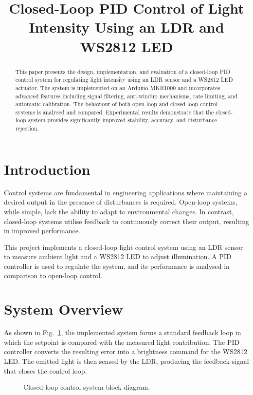 \documentclass[conference]{IEEEtran}
\title{Closed-Loop PID Control of Light Intensity Using an LDR and WS2812 LED}
\author{
\IEEEauthorblockN{Henry Johnson}
\IEEEauthorblockA{
MEng Electrical and Electronic Engineering\\
University of Lincoln\\
25590191@students.lincoln.ac.uk}
}
\begin{document}
\maketitle

\begin{abstract}
This paper presents the design, implementation, and evaluation of a closed-loop PID control system for regulating light intensity using an LDR sensor and a WS2812 LED actuator. The system is implemented on an Arduino MKR1000 and incorporates advanced features including signal filtering, anti-windup mechanisms, rate limiting, and automatic calibration. The behaviour of both open-loop and closed-loop control systems is analysed and compared. Experimental results demonstrate that the closed-loop system provides significantly improved stability, accuracy, and disturbance rejection.
\end{abstract}

\section{Introduction}

Control systems are fundamental in engineering applications where maintaining a desired output in the presence of disturbances is required. Open-loop systems, while simple, lack the ability to adapt to environmental changes. In contrast, closed-loop systems utilise feedback to continuously correct their output, resulting in improved performance.

This project implements a closed-loop light control system using an LDR sensor to measure ambient light and a WS2812 LED to adjust illumination. A PID controller is used to regulate the system, and its performance is analysed in comparison to open-loop control.

\section{System Overview}

As shown in Fig.~\ref{fig:block_diagram}, the implemented system forms a standard feedback loop in which the setpoint is compared with the measured light contribution. The PID controller converts the resulting error into a brightness command for the WS2812 LED. The emitted light is then sensed by the LDR, producing the feedback signal that closes the control loop.

\begin{figure}[!htbp]
\centering
{}
\caption{Closed-loop control system block diagram.}
\label{fig:block_diagram}
\end{figure}
\end{document}
